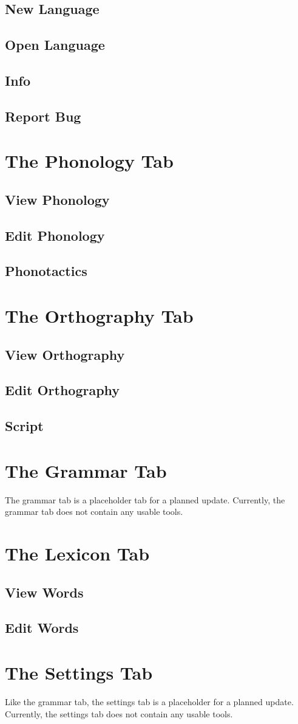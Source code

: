 \documentclass{report}
\begin{document}
	\section{New Language}
	\section{Open Language}
	\section{Info}
	\section{Report Bug}
	
	\chapter{The Phonology Tab}
	\section{View Phonology}
	\section{Edit Phonology}
	\section{Phonotactics}
	
	\chapter{The Orthography Tab}
	\section{View Orthography}
	\section{Edit Orthography}
	\section{Script}
	
	\chapter{The Grammar Tab}
	The grammar tab is a placeholder tab for a planned update. Currently, the grammar tab
	does not contain any usable tools.
	
	\chapter{The Lexicon Tab}
	\section{View Words}
	\section{Edit Words}
	
	\chapter{The Settings Tab}
	Like the grammar tab, the settings tab is a placeholder for a planned update. Currently,
	the settings tab does not contain any usable tools.
	
\end{document}
